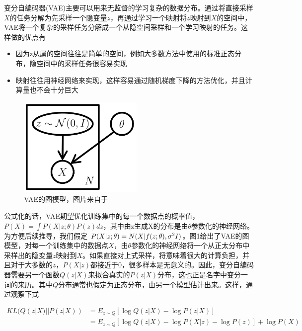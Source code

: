\documentclass[UTF8,openany,AutoFakeBold,AutoFakeSlant,cs4size]{ctexbook}
\begin{document}
变分自编码器(VAE)\cite{kingma2014autoencoding}主要可以用来无监督的学习复杂的数据分布。通过将直接采样$X$的任务分解为先采样一个隐变量$z$，再通过学习一个映射将$z$映射到$X$的空间中，VAE将一个复杂的采样任务分解成一个从隐空间采样和一个学习映射的任务。这样做的优点有
\begin{itemize}
	\item 因为z从属的空间往往是简单的空间，例如大多数方法中使用的标准正态分布，隐空间中的采样任务很容易实现
	\item 映射往往用神经网络来实现，这样容易通过随机梯度下降的方法优化，并且计算量也不会十分巨大
\end{itemize}

\begin{figure}
\centering
\includegraphics[width=6cm]{./images/vae_model.png}
\caption{VAE的图模型，图片来自于\cite{doersch2016tutorial}}
\label{fig:sample}
\end{figure}

公式化的话，VAE期望优化训练集中的每一个数据点的概率值，$P(X) = \int P(X | z; \theta) P(z) dz$，其中由z生成X的分布是由$\theta$参数化的神经网络。为方便后续推导，我们假定 $P(X | z; \theta) = N(X | f(z; \theta), \sigma^2 \* I)$。图1给出了VAE的图模型，对每一个训练集中的数据点$X$，由$\theta$参数化的神经网络将一个从正太分布中采样出的隐变量$z$映射到$X$。如果直接对上式采样，将意味着很大的计算负担，并且对于大多数的$z$，$P(X|z)$都接近于$0$，很多样本是无意义的。因此，变分自编码器需要另一个函数$Q(z|X)$来拟合真实的$P(z|X)$分布，这也正是名字中变分一词的来历。其中$Q$分布通常也假定为正态分布，由另一个模型估计出来。这样，通过观察下式

\begin{equation}
	\begin{aligned}
		KL(Q(z|X) ||P(z|X)) &= E_{z \sim Q}[\log Q(z|X) - \log P(z | X)] \\
		&= E_{z \sim Q}[\log Q(z|X) - \log P(X | z) - \log P(z)] + \log P(X) \\
	\end{aligned}
\end{equation}
\end{document}

